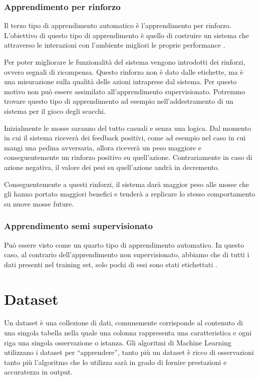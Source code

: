 \documentclass[12pt,italian]{report}
\begin{document}
\subsection{Apprendimento per rinforzo}
Il terzo tipo di apprendimento automatico è l’apprendimento per rinforzo. L’obiettivo di questo tipo di apprendimento è quello di costruire un sistema che attraverso le interazioni con l’ambiente migliori le proprie performance \cite{unsupervisedlearning}.

Per poter migliorare le funzionalità del sistema vengono introdotti dei rinforzi, ovvero segnali di ricompensa. Questo rinforzo non è dato dalle etichette, ma è una misurazione sulla qualità delle azioni intraprese dal sistema. Per questo motivo non può essere assimilato all'apprendimento supervisionato.
Potremmo trovare questo tipo di apprendimento ad esempio nell’addestramento di un sistema per il gioco degli scacchi.

Inizialmente le mosse saranno del tutto casuali e senza una logica. Dal momento in cui il sistema riceverà dei feedback positivi, come ad esempio nel caso in cui mangi una pedina avversaria, allora riceverà un peso maggiore e conseguentemente un rinforzo positivo su quell’azione. Contrariamente in caso di azione negativa, il valore dei pesi su quell’azione andrà in decremento.

Conseguentemente a questi rinforzi, il sistema darà maggior peso alle mosse che gli hanno portato maggiori benefici e tenderà a replicare lo stesso comportamento su nuove mosse future.
\subsection{Apprendimento semi supervisionato}
Può essere visto come un quarto tipo di apprendimento automatico. In questo caso, al contrario dell’apprendimento non supervisionato, abbiamo che di tutti i dati presenti nel training set, solo pochi di essi sono stati etichettati \cite{semisupervised}.



\chapter{Dataset}
Un dataset è una collezione di dati, comunemente corrisponde al contenuto di una singola tabella nella quale una colonna rappresenta una caratteristica e ogni riga una singola osservazione o istanza. Gli algoritmi di Machine Learning utilizzano i dataset per ``apprendere'', tanto più un dataset è ricco di osservazioni tanto più l'algoritmo che lo utilizza sarà in grado di fornire prestazioni e accuratezza in output. 
\end{document}
